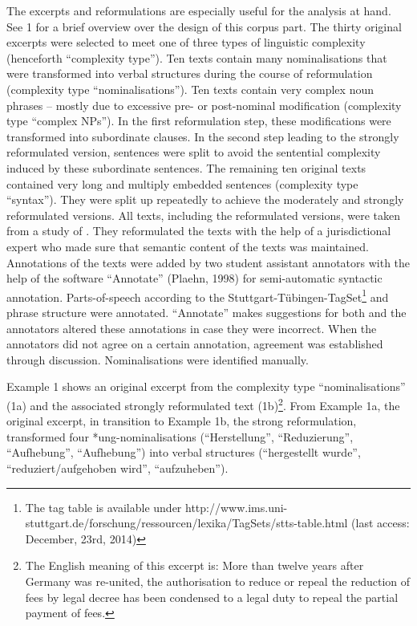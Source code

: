 \documentclass[output=paper]{langsci/langscibook}
\begin{document}
The excerpts and reformulations are especially useful for the analysis at hand. See 1 for a brief overview over the design of this corpus part. The thirty original excerpts were selected to meet one of three types of linguistic complexity (henceforth “complexity type”). Ten texts contain many nominalisations that were transformed into verbal structures during the course of reformulation (complexity type “nominalisations”). Ten texts contain very complex noun phrases – mostly due to excessive pre- or post-nominal modification (complexity type “complex NPs”). In the first reformulation step, these modifications were transformed into subordinate clauses. In the second step leading to the strongly reformulated version, sentences were split to avoid the sentential complexity induced by these subordinate sentences. The remaining ten original texts contained very long and multiply embedded sentences (complexity type “syntax”). They were split up repeatedly to achieve the moderately and strongly reformulated versions. All texts, including the reformulated versions, were taken from a study of \citet{HansenEtAl2006}. They reformulated the texts with the help of a jurisdictional expert who made sure that semantic content of the texts was maintained. Annotations of the texts were added by two student assistant annotators with the help of the software “Annotate” (Plaehn, 1998) for semi-automatic syntactic annotation. Parts-of-speech according to the Stuttgart-Tübingen-TagSet\footnote{The tag table is available under http://www.ims.uni-stuttgart.de/forschung/ressourcen/lexika/TagSets/stts-table.html (last access: December, 23rd, 2014)} and phrase structure were annotated. “Annotate” makes suggestions for both and the annotators altered these annotations in case they were incorrect. When the annotators did not agree on a certain annotation, agreement was established through discussion. Nominalisations were identified manually.

Example 1 shows an original excerpt from the complexity type “nominalisations” (1a) and the associated strongly reformulated text (1b)\footnote{The English meaning of this excerpt is: More than twelve years after Germany was re-united, the authorisation to reduce or repeal the reduction of fees by legal decree has been condensed to a legal duty to repeal the partial payment of fees.}. From Example 1a, the original excerpt, in transition to Example 1b, the strong reformulation, \citet{HansenEtAl2006} transformed four *ung-nominalisations (“Herstellung”, “Reduzierung”, “Aufhebung”, “Aufhebung”) into verbal structures (“hergestellt wurde”, “reduziert/aufgehoben wird”, “aufzuheben”).
\end{document}
